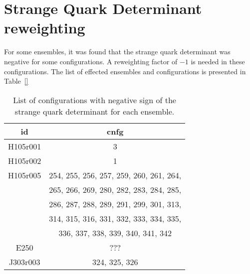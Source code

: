 
\chapter{Strange Quark Determinant reweighting}
\label{apex_strange_det}

For some ensembles, it was found that the strange quark determinant was negative for some configurations. A reweighting factor of $-1$ is needed in these configurations. The list of effected ensembles and configurations is presented in Table~\ref{}

\begin{table}[H]
\begin{center}
    \begin{tabular}{c c}
    id & cnfg \\
    \hline
    H105r001 & 3 \\
    H105r002 & 1 \\
    H105r005 & 254, 255, 256, 257, 259, 260, 261, 264, \\
             & 265, 266, 269, 280, 282, 283, 284, 285, \\
             & 286, 287, 288, 289, 291, 299, 301, 313,\\
             & 314, 315, 316, 331, 332, 333, 334, 335, \\
             & 336, 337, 338, 339, 340, 341, 342 \\
    \hline
    E250     & ??? \\
    \hline
    J303r003 & 324, 325, 326 \\
    \hline
    \end{tabular}
    \caption{List of configurations with negative sign of the strange quark determinant for each ensemble.}
\end{center}
\end{table}




